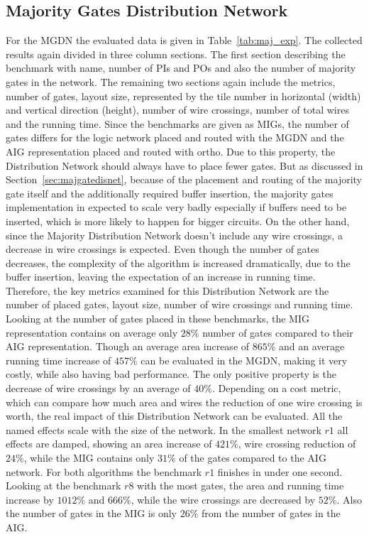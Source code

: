 \newpage
\subsection{Majority Gates Distribution Network}
For the MGDN the evaluated data is given in Table~\ref{tab:maj_exp}. The collected results again divided in three column sections. The first section describing the benchmark with name, number of PIs and POs and also the number of majority gates in the network. The remaining two sections again include the metrics, number of gates, layout size, represented by the tile number in horizontal (width) and vertical direction (height), number of wire crossings, number of total wires and the running time. Since the benchmarks are given as MIGs, the number of gates differs for the logic network placed and routed with the MGDN and the AIG representation placed and routed with ortho. 
Due to this property, the Distribution Network should always have to place fewer gates. But as discussed in Section~\ref{sec:majgatedisnet}, because of the placement and routing of the majority gate itself and the additionally required buffer insertion, the majority gates implementation in expected to scale very badly especially if buffers need to be inserted, which is more likely to happen for bigger circuits. On the other hand, since the Majority Distribution Network doesn't include any wire crossings, a decrease in wire crossings is expected. Even though the number of gates decreases, the complexity of the algorithm is increased dramatically, due to the buffer insertion, leaving the expectation of an increase in running time. Therefore, the key metrics examined for this Distribution Network are the number of placed gates, layout size, number of wire crossings and running time.
Looking at the number of gates placed in these benchmarks, the MIG representation contains on average only $28\%$ number of gates compared to their AIG representation. Though an average area increase of $865\%$ and an average running time increase of $457\%$ can be evaluated in the MGDN, making it very costly, while also having bad performance. The only positive property is the decrease of wire crossings by an average of $40\%$. Depending on a cost metric, which can compare how much area and wires the reduction of one wire crossing is worth, the real impact of this Distribution Network can be evaluated. All the named effects scale with the size of the network. In the smallest network $r1$ all effects are damped, showing an area increase of $421\%$, wire crossing reduction of $24\%$, while the MIG contains only $31\%$ of the gates compared to the AIG network. For both algorithms the benchmark $r1$ finishes in under one second. Looking at the benchmark $r8$ with the most gates, the area and running time increase by $1012\%$ and $666\%$, while the wire crossings are decreased by $52\%$. Also the number of gates in the MIG is only $26\%$ from the number of gates in the AIG.

